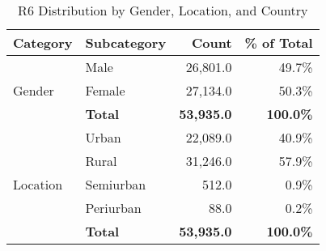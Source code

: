 \documentclass{article}
\begin{document}
\clearpage
\vspace{-2em}
\noindent
\begin{table}[H]
\centering
\caption{R6 Distribution by Gender, Location, and Country}
\begin{tabular}{llrr}
\toprule
\textbf{Category} & \textbf{Subcategory} & \textbf{Count} & \textbf{\% of Total} \\
\midrule

\multirow{3}{*}{Gender} 
    & Male & 26,801.0 & 49.7\% \\
    & Female & 27,134.0 & 50.3\% \\
    & \textbf{Total} & \textbf{53,935.0} & \textbf{100.0\%} \\
\midrule

\multirow{5}{*}{Location} 
    & Urban & 22,089.0 & 40.9\% \\
    & Rural & 31,246.0 & 57.9\% \\
    & Semiurban & 512.0 & 0.9\% \\
    & Periurban & 88.0 & 0.2\% \\
    & \textbf{Total} & \textbf{53,935.0} & \textbf{100.0\%} \\
\midrule


\end{tabular}
\end{table}
\end{document}
